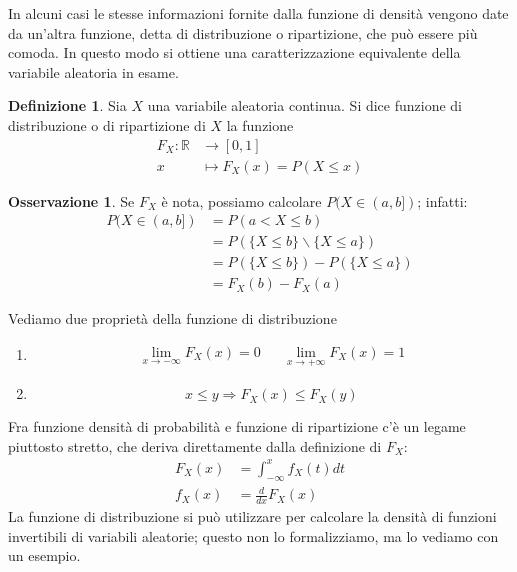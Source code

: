 \documentclass{article}
\theoremstyle{plain}
\theoremstyle{definition}
\newtheorem{definizione}{Definizione}[section]
\newtheorem{osservazione}{Osservazione}[section]
\theoremstyle{remark}
\begin{document}
In alcuni casi le stesse informazioni fornite dalla funzione di densità vengono date da un'altra funzione, detta di distribuzione o ripartizione, che può essere più comoda. In questo modo si ottiene una caratterizzazione equivalente della variabile aleatoria in esame.
\begin{definizione}
	Sia $X$ una variabile aleatoria continua. Si dice funzione di distribuzione o di ripartizione di $X$ la funzione
	\begin{align*}
		F_X:\mathds{R}&\to[0,1]\\
		x&\mapsto F_X(x)=P(X\leq x)
	\end{align*}
\end{definizione}
\begin{osservazione}
	Se $F_X$ è nota, possiamo calcolare $P(X\in(a,b])$; infatti:
	\begin{align*}
		P(X\in(a,b])&=P(a<X\leq b)\\
		&=P(\{X\leq b\}\smallsetminus\{X\leq a\})\\
		&=P(\{X\leq b\})-P(\{X\leq a\})\\
		&=F_X(b)-F_X(a)
	\end{align*}
\end{osservazione}
Vediamo due proprietà della funzione di distribuzione
\begin{enumerate}
	\item 
	\begin{align*}
		\lim_{x\to-\infty}F_X(x)=0&&\lim_{x\to+\infty}F_X(x)=1
	\end{align*}
	\item
	\begin{equation*}
		x\leq y\Rightarrow F_X(x)\leq F_X(y)
	\end{equation*}
\end{enumerate}
Fra funzione densità di probabilità e funzione di ripartizione c'è un legame piuttosto stretto, che deriva direttamente dalla definizione di $F_X$:
\begin{align*}
	F_X(x)&=\int_{-\infty}^xf_X(t)dt\\
	f_X(x)&=\frac{d}{dx}F_X(x)
\end{align*}
La funzione di distribuzione si può utilizzare per calcolare la densità di funzioni invertibili di variabili aleatorie; questo non lo formalizziamo, ma lo vediamo con un esempio.
\end{document}
